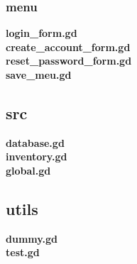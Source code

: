 \documentclass{article}
\begin{document}
\subsubsection{menu}
\textbf{login\_form.gd}\\

\textbf{create\_account\_form.gd}\\

\textbf{reset\_password\_form.gd}\\

\textbf{save\_meu.gd}\\

\subsection{src}
\textbf{database.gd}\\

\textbf{inventory.gd}\\

\textbf{global.gd}\\

\subsection{utils}
\textbf{dummy.gd}\\

\textbf{test.gd}\\

\restoregeometry
\end{document}
